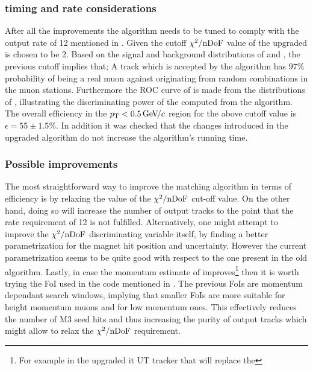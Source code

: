 \subsubsection{\hltone timing and rate considerations}
After all the improvements the \mvTTm algorithm needs to be tuned to comply with the \hltone output rate of 12
\khz mentioned in . Given the cutoff $\chi^2/\rm nDoF$ value of the upgraded \mvTTm is chosen to be 2.
Based on the signal and background distributions of  and , the previous cutoff implies that;
A \velo track which is accepted by the \mvTTm algorithm has $97\%$ probability of being a real muon against originating from
random combinations in the muon stations.
Furthermore the ROC curve of  is made from the \cdf distributions of , illustrating
the discriminating power of the \chisq computed from the \mvTTm algorithm.
The overall \mvTTm efficiency in the $\mbox{$p_{\rm T}$}<0.5{\mathrm{\,Ge\kern -0.1em V\!/}c}$ region for the above cutoff value is $\epsilon = 55 \pm 1.5 \%$.
In addition it was checked that the changes introduced in the upgraded \mvTTm algorithm
do not increase the algorithm's running time.

\subsubsection{Possible improvements}
The most straightforward way to improve the matching algorithm in terms of efficiency is
by relaxing the value of the $\chi^2/\rm nDoF$ cut-off value. On the other hand, doing so will increase the number
of output tracks to the point that the \hltone rate requirement of 12 \khz is not fulfilled.
Alternatively, one might attempt to improve the $\chi^2/\rm nDoF$ discriminating variable itself,
by finding a better parametrization for the magnet hit position and uncertainty. However the current
parametrization seems to be quite good with respect to the one present in the old \mvm algorithm.
Lastly, in case the momentum estimate of \ttracker improves\footnote{For example in the upgraded it
UT tracker that will replace the \ttracker} then it is worth trying the FoI used in the \muonID code
mentioned in . The previous FoIs are momentum dependant search windows, implying
that smaller FoIs are more suitable for height momentum muons and \viceversa for low momentum ones.
This effectively reduces the number of M3 seed hits and thus increasing the purity of output tracks
which might allow to relax the $\chi^2/\rm nDoF$ requirement.
